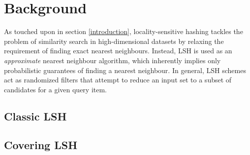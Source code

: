 \section{Background}
\label{background}

As touched upon in section \ref{introduction}, locality-sensitive hashing tackles the problem of similarity search in high-dimensional datasets by relaxing the requirement of finding exact nearest neighbours. Instead, LSH is used as an \textit{approximate} nearest neighbour algorithm, which inherently implies only probabilistic guarantees of finding a nearest neighbour. In general, LSH schemes act as randomized filters that attempt to reduce an input set to a subset of candidates for a given query item.

\subsection{Classic LSH}
\label{background-classic-lsh}

\subsection{Covering LSH}
\label{background-covering-lsh}
